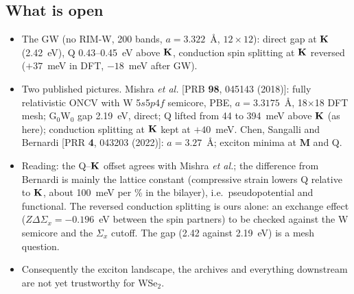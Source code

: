 \subsection{What is open}
\begin{itemize}[nosep,leftmargin=1.2em]
\item The GW (no RIM-W, 200 bands, $a=3.322$~\AA, $12\times12$): direct gap at $\mathbf{K}$
(2.42~eV), Q 0.43--0.45~eV above $\mathbf{K}$, conduction spin splitting at $\mathbf{K}$ reversed
($+37$~meV in DFT, $-18$~meV after GW).
\item Two published pictures. Mishra \emph{et al.} [PRB \textbf{98}, 045143 (2018)]:
fully relativistic ONCV with W 5$s$5$p$4$f$ semicore, PBE, $a=3.3175$~\AA, 18$\times$18
DFT mesh; G$_0$W$_0$ gap 2.19~eV, direct; Q lifted from 44 to 394~meV above $\mathbf{K}$ (as
here); conduction splitting at $\mathbf{K}$ kept at $+40$~meV. Chen, Sangalli and Bernardi
[PRR \textbf{4}, 043203 (2022)]: $a=3.27$~\AA; exciton minima at $\mathbf{M}$ and Q.
\item Reading: the Q--$\mathbf{K}$ offset agrees with Mishra \emph{et al.}; the difference from
Bernardi is mainly the lattice constant (compressive strain lowers Q relative to $\mathbf{K}$,
about 100~meV per \% in the bilayer), i.e.\ pseudopotential and functional. The
reversed conduction splitting is ours alone: an exchange effect ($Z\Delta\Sigma_x=-0.196$~eV
between the spin partners) to be checked against the W semicore and the $\Sigma_x$
cutoff. The gap (2.42 against 2.19~eV) is a mesh question.
\item Consequently the exciton landscape, the archives and everything downstream
are not yet trustworthy for WSe$_2$.
\end{itemize}

